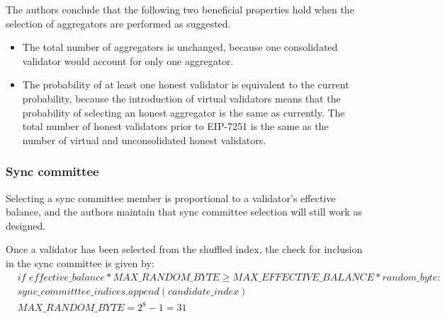 \documentclass{article}
\begin{document}
 

The authors conclude that the following two beneficial properties hold when the
selection of aggregators are performed as suggested.

\begin{itemize}
  \item The total number of aggregators is unchanged, because one consolidated
    validator would account for only one aggregator.
  \item The probability of at least one honest validator is equivalent to the
    current probability, because the introduction of virtual validators means
    that the probability of selecting an honest aggregator is the same as
    currently. The total number of honest validators prior to EIP-7251 is the
    same as the number of virtual and unconsolidated honest validators.
\end{itemize}

\subsubsection*{Sync committee}
Selecting a sync committee member is proportional to a validator's effective
balance, and the authors maintain that sync committee selection will still work
as designed.

Once a validator has been selected from the shuffled index, the check for
inclusion in the sync committee is given by:
\begin{equation*}
  \begin{split}
& \textit{if effective\_balance} * \textit{MAX\_RANDOM\_BYTE} \geqslant \textit{MAX\_EFFECTIVE\_BALANCE} * random\_byte:\\
& sync\_committtee\_indices.append(candidate\_index)\\
& \textit{MAX\_RANDOM\_BYTE} = 2^8 - 1 = 31\\
  \end{split}
\end{equation*}
\end{document}

